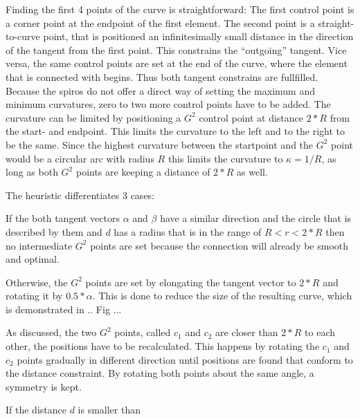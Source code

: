 Finding the first 4 points of the curve is straightforward: The first control point is a corner point at the endpoint of the first element. The second point is a straight-to-curve point, that is positioned an infinitesimally small distance in the direction of the tangent from the first point. This constrains the \enquote{outgoing} tangent. Vice versa, the same control points are set at the end of the curve, where the element that is connected with begins. Thus both tangent constrains are fullfilled. Because the spiros do not offer a direct way of setting the maximum and minimum curvatures, zero to two more control points have to be added. The curvature can be limited by positioning a $G^2$ control point at distance $2 * R$ from the start- and endpoint. This limits the curvature to the left and to the right to be the same. Since the highest curvature between the startpoint and the $G^2$ point would be a circular arc with radius $R$ this limits the curvature to $\kappa = 1/R$, as long as both $G^2$ points are keeping a distance of $2*R$ as well.

The heuristic differentiates 3 cases:

If the both tangent vectors $\alpha$ and $\beta$ have a similar direction and the circle that is described by them and $d$ has a radius that is in the range of $R < r < 2*R$ then no intermediate $G^2$ points are set because the connection will already be smooth and optimal.

Otherwise, the $G^2$ points are set by elongating the tangent vector to $2*R$ and rotating it by $0.5 * \alpha$. This is done to reduce the size of the resulting curve, which is demonstrated in .. Fig ...

As discussed, the two $G^2$ points, called $c_1$ and $c_2$ are closer than $2 * R$ to each other, the positions have to be recalculated. This happens by rotating the $c_1$ and $c_2$ points gradually in different direction until positions are found that conform to the distance constraint. By rotating both points about the same angle, a symmetry is kept.

If the distance $d$ is smaller than 

